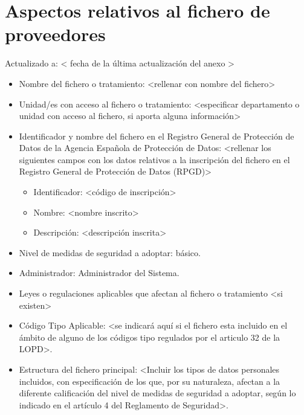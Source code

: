 \documentclass[a4paper,11pt,bibtotoc,noliststotoc]{scrbook}
\begin{document}
\section{Aspectos relativos al fichero de proveedores}


Actualizado a: < fecha de la última actualización del anexo >

\begin{itemize}
\item Nombre del fichero o tratamiento: <rellenar con nombre del fichero>

\item Unidad/es con acceso al fichero o tratamiento: <especificar departamento o unidad con acceso al fichero, si aporta alguna información>

\item Identificador y nombre del fichero en el Registro General de Protección de Datos de la Agencia Española de Protección de Datos: <rellenar los siguientes campos con los datos relativos a la inscripción del fichero en el Registro General de Protección de Datos (RPGD)>
	\begin{itemize}
	\item Identificador: <código de inscripción>
	\item Nombre: <nombre inscrito>
	\item Descripción: <descripción inscrita>
	\end{itemize}

\item Nivel de medidas de seguridad a adoptar: básico.

\item Administrador: Administrador del Sistema.

\item Leyes o regulaciones aplicables que afectan al fichero o tratamiento <si existen>

\item Código Tipo Aplicable: <se indicará aquí si el fichero esta incluido en el ámbito de alguno de los códigos tipo regulados por el articulo 32 de la LOPD>.

\item Estructura del fichero principal: <Incluir los tipos de datos personales incluidos, con especificación de los que, por su naturaleza, afectan a la diferente calificación del nivel de medidas de seguridad a adoptar, según lo indicado en el artículo 4 del Reglamento de Seguridad>.


\end{itemize}
\end{document}
